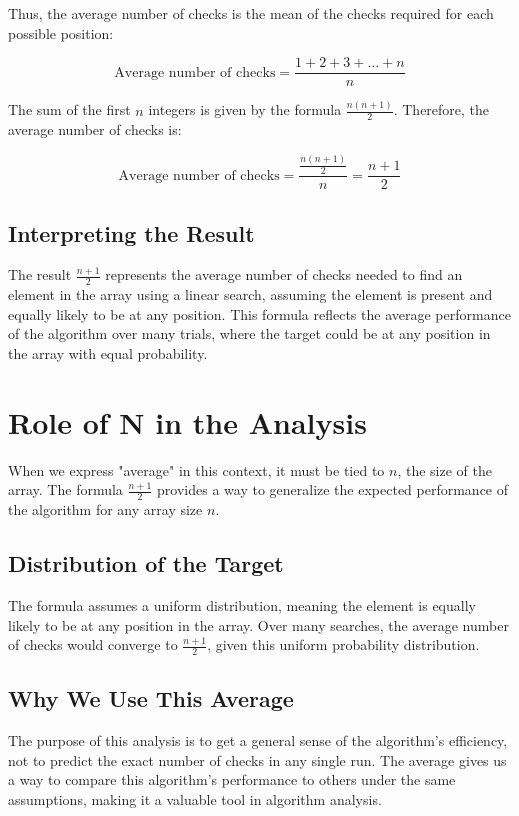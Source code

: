 \documentclass{article}
\begin{document}
Thus, the average number of checks is the mean of the checks required for each possible position:

\[
\text{Average number of checks} = \frac{1 + 2 + 3 + \dots + n}{n}
\]

The sum of the first \( n \) integers is given by the formula \( \frac{n(n + 1)}{2} \). Therefore, the average number of checks is:

\[
\text{Average number of checks} = \frac{\frac{n(n + 1)}{2}}{n} = \frac{n + 1}{2}
\]

\subsection*{Interpreting the Result}

The result \( \frac{n + 1}{2} \) represents the average number of checks needed to find an element in the array using a linear search, assuming the element is present and equally likely to be at any position. This formula reflects the average performance of the algorithm over many trials, where the target could be at any position in the array with equal probability.

\section*{Role of N in the Analysis}

When we express "average" in this context, it must be tied to \( n \), the size of the array. The formula \( \frac{n + 1}{2} \) provides a way to generalize the expected performance of the algorithm for any array size \( n \).

\subsection*{Distribution of the Target}

The formula assumes a uniform distribution, meaning the element is equally likely to be at any position in the array. Over many searches, the average number of checks would converge to \( \frac{n + 1}{2} \), given this uniform probability distribution.

\subsection*{Why We Use This Average}

The purpose of this analysis is to get a general sense of the algorithm's efficiency, not to predict the exact number of checks in any single run. The average gives us a way to compare this algorithm’s performance to others under the same assumptions, making it a valuable tool in algorithm analysis.
\end{document}
